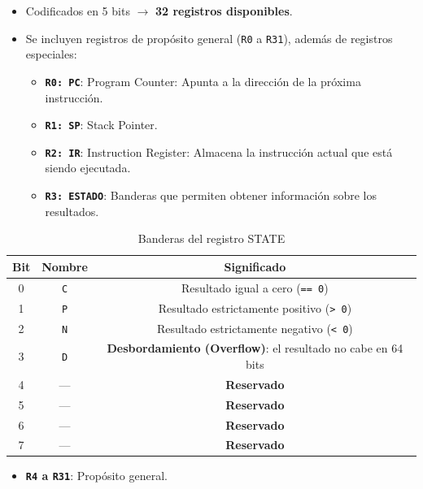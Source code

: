 \documentclass{article}
\begin{document}
\begin{itemize}
    \item Codificados en 5 bits $\rightarrow$ \textbf{32 registros disponibles}.
    \item Se incluyen registros de propósito general (\texttt{R0} a \texttt{R31}), además de registros especiales:
    \begin{itemize}
        \item \textbf{\texttt{R0: PC}}: Program Counter: Apunta a la dirección de la próxima instrucción.
        \item \textbf{\texttt{R1: SP}}: Stack Pointer.
        \item \textbf{\texttt{R2: IR}}: Instruction Register: Almacena la instrucción actual que está siendo ejecutada.
        \item \textbf{\texttt{R3: ESTADO}}: Banderas que permiten obtener información sobre los resultados.
    \end{itemize}
\end{itemize}

\begin{table}[H]
    \centering
    \begin{tabular}{|c|c|c|}
    \hline
    \textbf{Bit} & \textbf{Nombre} & \textbf{Significado} \\
    \hline
    0 & \texttt{C} & Resultado igual a cero (\texttt{== 0}) \\
    1 & \texttt{P} & Resultado estrictamente positivo (\texttt{> 0}) \\
    2 & \texttt{N} & Resultado estrictamente negativo (\texttt{< 0}) \\
    3 & \texttt{D} & \textbf{Desbordamiento (Overflow)}: el resultado no cabe en 64 bits \\
    4 & — & \textbf{Reservado} \\
    5 & — & \textbf{Reservado} \\
    6 & — & \textbf{Reservado} \\
    7 & — & \textbf{Reservado} \\
    \hline
    \end{tabular}
    \caption{Banderas del registro STATE}
\end{table}

\begin{itemize}
    \item \textbf{\texttt{R4} a \texttt{R31}}: Propósito general.
\end{itemize}
\end{document}

